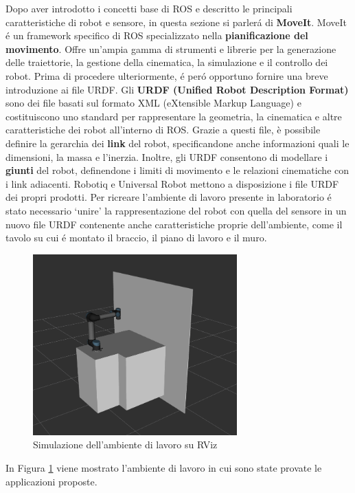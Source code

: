 Dopo aver introdotto i concetti base di ROS e descritto le principali caratteristiche di robot e sensore, in questa sezione si 
parler\'{a} di \textbf{MoveIt}. 
MoveIt \'{e} un framework specifico di ROS specializzato nella \textbf{pianificazione del movimento}. Offre un'ampia gamma 
di strumenti e librerie per la generazione delle traiettorie, la gestione della cinematica, la simulazione e il controllo 
dei robot. 
Prima di procedere ulteriormente, \'{e} per\'{o} opportuno fornire una breve introduzione ai file URDF.
Gli \textbf{URDF (Unified Robot Description Format)} sono dei file basati sul formato XML (eXtensible Markup Language) e 
costituiscono uno standard per rappresentare la geometria, la cinematica e altre caratteristiche dei robot all'interno di ROS. 
Grazie a questi file, è possibile definire la gerarchia dei \textbf{link} del robot, specificandone anche informazioni quali  
le dimensioni, la massa e l'inerzia. Inoltre, gli URDF consentono di modellare i \textbf{giunti}
del robot, definendone i limiti di movimento e le relazioni cinematiche con i link adiacenti. 
Robotiq e Universal Robot mettono a disposizione i file URDF dei propri prodotti. Per ricreare l'ambiente di lavoro presente in 
laboratorio \'{e} stato necessario `unire' la rappresentazione del robot con quella del sensore in un nuovo file URDF contenente 
anche caratteristiche proprie dell'ambiente, come il tavolo su cui \'{e} montato il braccio, il piano di lavoro e il muro. 
\begin{figure}[H]
    \centering
    \includegraphics*[width=0.70\textwidth]{images/workcell.png}
    \caption{Simulazione dell'ambiente di lavoro su RViz}
    \label{fig:workcell}
\end{figure}
In Figura \ref{fig:workcell} viene mostrato l'ambiente di lavoro in cui sono state provate le applicazioni proposte. 
